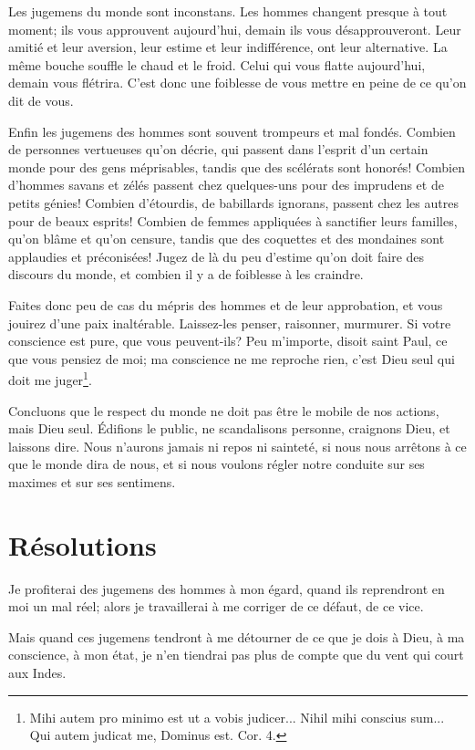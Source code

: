 \documentclass[instructions.tex]{subfiles}
\begin{document}
\tertio Les jugemens du monde sont inconstans. Les hommes changent presque à tout moment; ils vous approuvent aujourd'hui, demain ils vous désapprouveront. Leur amitié et leur aversion, leur estime et leur indifférence, ont leur alternative. La même bouche souffle le chaud et le froid. Celui qui vous flatte aujourd'hui, demain vous flétrira. C'est donc une foiblesse de vous mettre en peine de ce qu'on dit de vous.

\quarto Enfin les jugemens des hommes sont souvent trompeurs et mal fondés. Combien de personnes vertueuses qu'on décrie, qui passent dans l'esprit d'un certain monde pour des gens méprisables, tandis que des scélérats sont honorés! Combien d'hommes savans et zélés passent chez quelques-uns pour des imprudens et de petits génies! Combien d'étourdis, de babillards ignorans, passent chez les autres pour de beaux esprits! Combien de femmes appliquées à sanctifier leurs familles, qu'on blâme et qu'on censure, tandis que des coquettes et des mondaines sont applaudies et préconisées! Jugez de là du peu d'estime qu'on doit faire des discours du monde, et combien il y a de foiblesse à les craindre.

Faites donc peu de cas du mépris des hommes et de leur approbation, et vous jouirez d'une paix inaltérable. Laissez-les penser, raisonner, murmurer. Si votre conscience est pure, que vous peuvent-ils? Peu m'importe, disoit saint Paul, ce que vous pensiez de moi; ma conscience ne me reproche rien, c'est Dieu seul qui doit me juger\footnote{Mihi autem pro minimo est ut a vobis judicer... Nihil mihi conscius sum... Qui autem judicat me, Dominus est. Cor. 4.}.

Concluons que le respect du monde ne doit pas être le mobile de nos actions, mais Dieu seul. Édifions le public, ne scandalisons personne, craignons Dieu, et laissons dire. Nous n'aurons jamais ni repos ni sainteté, si nous nous arrêtons à ce que le monde dira de nous, et si nous voulons régler notre conduite sur ses maximes et sur ses sentimens.


\section{Résolutions}

\primo Je profiterai des jugemens des hommes à mon égard, quand ils reprendront en moi un mal réel; alors je travaillerai à me corriger de ce défaut, de ce vice.

\secundo Mais quand ces jugemens tendront à me détourner de ce que je dois à Dieu, à ma conscience, à mon état, je n'en tiendrai pas plus de compte que du vent qui court aux Indes.

\end{document}
